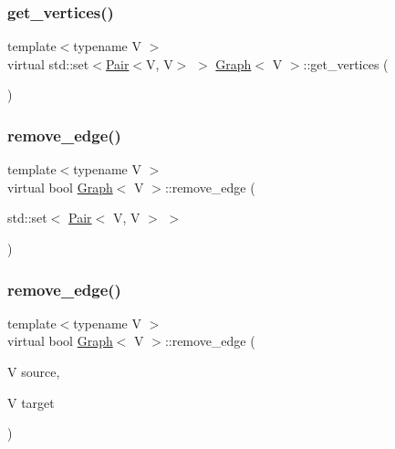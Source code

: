 \mbox{\label{classGraph_afc915b991e4c288153ef2bf0b78e1018}} 
\subsubsection{\texorpdfstring{get\+\_\+vertices()}{get\_vertices()}}
{\footnotesize\ttfamily template$<$typename V $>$ \\
virtual std\+::set$<$\hyperlink{classPair}{Pair}$<$V, V$>$ $>$ \hyperlink{classGraph}{Graph}$<$ V $>$\+::get\+\_\+vertices (\begin{DoxyParamCaption}{ }\end{DoxyParamCaption})\hspace{0.3cm}{\ttfamily [virtual]}}

\mbox{\label{classGraph_a1b9b0e39be7b5da7f1e8ce8c5d52be8e}} 
\subsubsection{\texorpdfstring{remove\+\_\+edge()}{remove\_edge()}\hspace{0.1cm}{\footnotesize\ttfamily [1/2]}}
{\footnotesize\ttfamily template$<$typename V $>$ \\
virtual bool \hyperlink{classGraph}{Graph}$<$ V $>$\+::remove\+\_\+edge (\begin{DoxyParamCaption}\item[{std\+::set$<$ \hyperlink{classPair}{Pair}$<$ V, V $>$ $>$}]{ }\end{DoxyParamCaption})\hspace{0.3cm}{\ttfamily [virtual]}}

\mbox{\label{classGraph_aaea37d99e6b0202c7c6fe132e0e5a372}} 
\subsubsection{\texorpdfstring{remove\+\_\+edge()}{remove\_edge()}\hspace{0.1cm}{\footnotesize\ttfamily [2/2]}}
{\footnotesize\ttfamily template$<$typename V $>$ \\
virtual bool \hyperlink{classGraph}{Graph}$<$ V $>$\+::remove\+\_\+edge (\begin{DoxyParamCaption}\item[{V}]{source,  }\item[{V}]{target }\end{DoxyParamCaption})\hspace{0.3cm}{\ttfamily [virtual]}}

